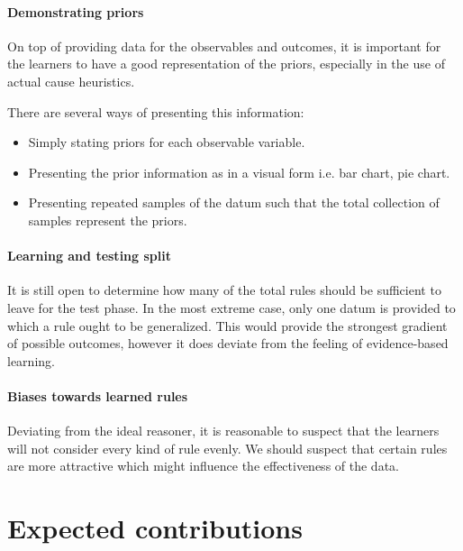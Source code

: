 \documentclass[10pt,letterpaper]{article}
\begin{document}
\paragraph{Demonstrating priors}

On top of providing data for the observables and outcomes, it is important for
the learners to have a good representation of the priors, especially in the use
of actual cause heuristics.

There are several ways of presenting this information:
\begin{itemize}
  \item Simply stating priors for each observable variable.
  \item Presenting the prior information as in a visual form i.e. bar chart, pie chart.
  \item Presenting repeated samples of the datum such that the total collection of
    samples represent the priors.
\end{itemize}

\paragraph{Learning and testing split}

It is still open to determine how many of the total rules should be sufficient to leave
for the test phase. In the most extreme case, only one datum is provided to
which a rule ought to be generalized. This would provide the strongest gradient
of possible outcomes, however it does deviate from the feeling of
evidence-based learning.

\paragraph{Biases towards learned rules}

Deviating from the ideal reasoner, it is reasonable to suspect that the
learners will not consider every kind of rule evenly. We should suspect that
certain rules are more attractive which might influence the effectiveness of
the data. 


\section*{Expected contributions}
\end{document}
